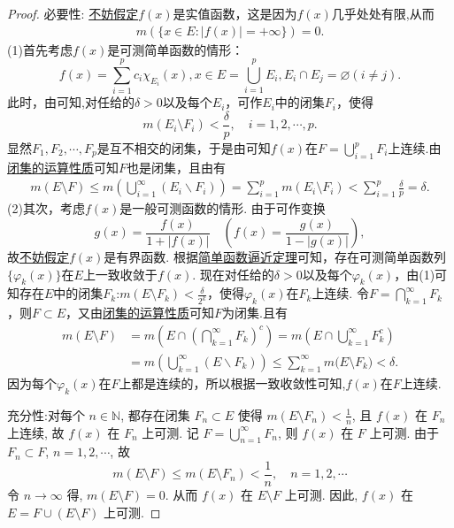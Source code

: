 \documentclass[../../main.tex]{subfiles}%
\begin{document}
\begin{proof}

{\heiti 必要性:}
\hyperlink{不妨假定f是实值函数的原因}{不妨假定}\(f(x)\)是实值函数，这是因为$f(x)$几乎处处有限,从而
\begin{align*}
m(\{x \in E: |f(x)| = +\infty\}) = 0.
\end{align*}
(1)首先考虑\(f(x)\)是可测简单函数的情形：
\[f(x) = \sum_{i = 1}^{p} c_{i} \chi_{E_{i}}(x), x \in E = \bigcup_{i = 1}^{p} E_{i}, E_{i} \cap E_{j} = \varnothing (i \neq j).\]
此时，由可知,对任给的\(\delta > 0\)以及每个\(E_{i}\)，可作\(E_{i}\)中的闭集\(F_{i}\)，使得
\[m(E_{i} \setminus F_{i}) < \frac{\delta}{p}, \quad i = 1,2,\cdots,p.\]
显然\(F_{1},F_{2},\cdots,F_{p}\)是互不相交的闭集，于是由可知\(f(x)\)在\(F = \bigcup_{i = 1}^{p} F_{i}\)上连续.由\hyperref[theorem:闭集的运算性质]{闭集的运算性质}可知\(F\)也是闭集，且由有
\begin{align*}
m(E \setminus F) \leqslant m(\bigcup_{i=1}^{\infty}(E_i\backslash F_i))=\sum_{i = 1}^{p} m(E_{i} \setminus F_{i}) < \sum_{i = 1}^{p} \frac{\delta}{p} = \delta.
\end{align*}
(2)其次，考虑\(f(x)\)是一般可测函数的情形. 由于可作变换
\[g(x) = \frac{f(x)}{1 + |f(x)|} \quad \left(f(x) = \frac{g(x)}{1 - |g(x)|}\right),\]
故\hyperlink{不妨设f有界的原因}{不妨假定}\(f(x)\)是有界函数. 根据\hyperref[theorem:简单函数逼近定理]{简单函数逼近定理}可知，存在可测简单函数列\(\{\varphi_{k}(x)\}\)在\(E\)上一致收敛于\(f(x)\). 现在对任给的\(\delta > 0\)以及每个\(\varphi_{k}(x)\)，由(1)可知存在\(E\)中的闭集\(F_{k}\):\(m(E \setminus F_{k}) < \frac{\delta}{2^{k}}\)，使得\(\varphi_{k}(x)\)在\(F_{k}\)上连续. 令\(F = \bigcap_{k = 1}^{\infty} F_{k}\)，则\(F \subset E\)，又由\hyperref[theorem:闭集的运算性质]{闭集的运算性质}可知$F$为闭集.且有
\begin{align*}
m(E\setminus F)&=m(E\cap \left( \bigcap_{k=1}^{\infty}{F_k} \right) ^c)=m(E\cap \bigcup_{k=1}^{\infty}{F_{k}^{c}})
\\
&=m(\bigcup_{k=1}^{\infty}{\left( E\backslash F_k \right)})\leqslant \sum_{k=1}^{\infty}{m(E}\setminus F_k)<\delta .
\end{align*}
因为每个\(\varphi_{k}(x)\)在\(F\)上都是连续的，所以根据一致收敛性可知,\(f(x)\)在\(F\)上连续.

{\heiti 充分性:}对每个 \( n \in \mathbb{N} \), 都存在闭集 \( F_{n} \subset E \) 使得 \( m(E \setminus F_{n}) < \frac{1}{n} \), 且 \( f(x) \) 在 \( F_{n} \) 上连续, 故 \( f(x) \) 在 \( F_{n} \) 上可测.
记 \( F = \bigcup_{n = 1}^{\infty} F_{n} \), 则 \( f(x) \) 在 \( F \) 上可测. 由于 \( F_{n} \subset F \), \( n = 1, 2, \cdots \), 故
\[
m(E \setminus F) \leqslant m(E \setminus F_{n}) < \frac{1}{n}, \quad n = 1, 2, \cdots
\]
令 \( n \to \infty \) 得, \( m(E \setminus F) = 0 \). 从而 \( f(x) \) 在 \( E \setminus F \) 上可测. 因此, \( f(x) \) 在 \( E = F \cup (E \setminus F) \) 上可测.
\end{proof}
\end{document}
